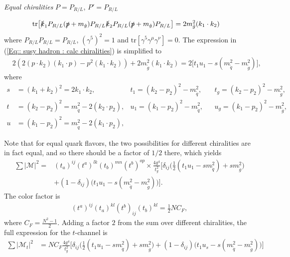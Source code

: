 \documentclass[twoside,english]{uiofysmaster}
\begin{document}
\begin{center}
\textit{Equal chiralities} $P=P_{R/L}$, $P'=P_{R/L}$
\end{center}
\begin{align*}
\text{tr} \big[ 
\slashed{k}_1 P_{R/L} (\slashed{p} + m_{\tilde{g}}) P_{R/L} \slashed{k}_2 P_{R/L} (\slashed{p} + m_{\tilde{g}}) P_{R/L} \big]&= 2  m_{\tilde{g}}^2 (k_1 \cdot k_2)
\end{align*}
where $P_{R/L}P_{R/L} = P_{R/L}$, $(\gamma^5)^2 = 1$ and $\text{tr}[\gamma^5 \gamma^{\mu} \gamma^{\nu}]=0$. The expression in (\ref{Eq:: susy hadron : calc chiralities}) is simplified to
\begin{align*}
&2(2 (p \cdot k_2) (k_1 \cdot p) - p^2 (k_1 \cdot k_2) ) + 2m_{\tilde{g}}^2 (k_1 \cdot k_2) =  2 \big[t_1u_1 -s(m_{\tilde{q}}^2 - m_{\tilde{g}}^2) \big],
\end{align*}
where 
\begin{align*}
s &= (k_1 + k_2)^2 = 2 k_1 \cdot k_2, &t_1 = (k_2-p_2)^2 - m_{\tilde{q}}^2, &&t_g = (k_2-p_2)^2 - m_{\tilde{g}}^2,\\
t &= (k_2-p_2)^2 = m_{\tilde{q}}^2 - 2 (k_2 \cdot p_2), &u_1 = (k_1-p_2)^2 - m_{\tilde{q}}^2, &&u_g = (k_1-p_2)^2 - m_{\tilde{g}}^2,\\
u &= (k_1 - p_2)^2 = m_{\tilde{q}}^2 - 2 (k_1 \cdot p_2),
\end{align*}

Note that for equal quark flavors, the two possibilities for different chiralities are in fact equal, and so there should be a factor of $1/2$ there, which yields 
\begin{align*}
\sum |\mathcal{M}|^2 =&   (t_a)^{ij} (t^a)^{lk} (t_b)^{mn} (t^b)^{op}  \times\frac{4 g^4}{t_g^2} \Big[\delta_{ij} \big(\frac{1}{2}(t_1u_1 -sm_{\tilde{q}}^2)+  sm_{\tilde{g}}^2 \big)\\& + (1-\delta_{ij})\big(t_1u_1 -s(m_{\tilde{q}}^2- m_{\tilde{g}}^2) \big)\Big].
\end{align*}
The color factor is
\begin{align*}
(t^a)^{ij}(t_a)^{kl}(t^b)_{ij}(t_b)^{kl} = \frac{1}{2}NC_F,
\end{align*}
where $C_F = \frac{N^2 -1}{2}$. Adding a factor $2$ from the sum over different chiralities, the full expression for the $t$-channel is
\begin{align*}
\sum |\mathcal{M}_t|^2 &= NC_F \frac{4g^4}{t_g^2} \Big[ \delta_{ij} \big(\frac{1}{2}(t_1u_1-sm_{\tilde{q}}^2) + sm_{\tilde{g}}^2 \big) + (1-\delta_{ij}) \big(t_1u_s - s(m_{\tilde{q}}^2 - m_{\tilde{g}}^2) \big)\Big]
\end{align*}
\end{document}
